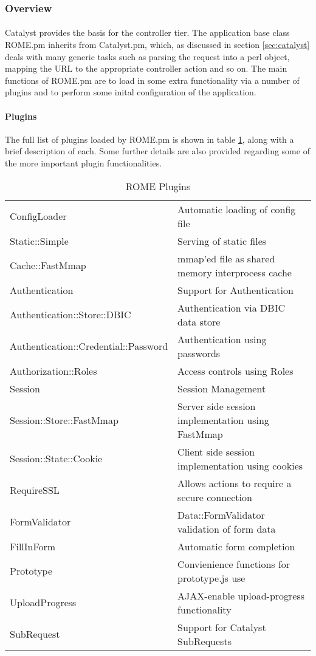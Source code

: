 \subsubsection{Overview}
\label{sec:controller_overview}


\paragraph{}
Catalyst provides the basis for the controller tier. The application base class ROME.pm inherits from Catalyst.pm, which, as discussed in section \ref{sec:catalyst} deals with many generic tasks such as parsing the request into a perl object, mapping the URL to the appropriate controller action and so on. The main functions of ROME.pm are to load in some extra functionality via a number of plugins and to perform some inital configuration of the application.

\paragraph{Plugins}
The full list of plugins loaded by ROME.pm is shown in table \ref{tab:plugins}, along with a brief description of each. Some further details are also provided regarding some of the more important plugin functionalities.


\begin{table}
\caption{ROME Plugins}
\label{tab:plugins}
\begin{scriptsize}
\begin{tabular}{ll}
ConfigLoader & Automatic loading of config file\\
Static::Simple & Serving of static files\\
Cache::FastMmap & mmap'ed file as shared memory interprocess cache\\
Authentication &  Support for Authentication\\
Authentication::Store::DBIC & Authentication via DBIC data store\\
Authentication::Credential::Password & Authentication using passwords\\
Authorization::Roles & Access controls using Roles\\
Session & Session Management\\
Session::Store::FastMmap & Server side session implementation using FastMmap\\
Session::State::Cookie & Client side session implementation using cookies\\
RequireSSL & Allows actions to require a secure connection\\
FormValidator & Data::FormValidator validation of form data\\
FillInForm & Automatic form completion\\
Prototype & Convienience functions for prototype.js use\\
UploadProgress & AJAX-enable upload-progress functionality\\
SubRequest & Support for Catalyst SubRequests\\
\end{tabular}
\end{scriptsize}
\end{table}

